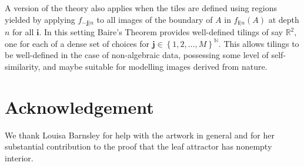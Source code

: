 \documentclass{amsproc}%
\theoremstyle{plain}
\theoremstyle{definition}
\numberwithin{equation}{section}
\begin{document}
A version of the theory also applies when the tiles are defined using regions
yielded by applying $f_{-\mathbf{j}|n}$ to all images of the boundary of $A$
in $f_{\mathbf{i}|n}(A)$ at depth $n$ for all $\mathbf{i}.$ In this setting
Baire's Theorem provides well-defined tilings of say $\mathbb{R}^{2},$ one for
each of a dense set of choices for $\mathbf{j\in}\left\{  1,2,\dots,M\right\}
^{\mathbb{N}}.$ This allows tilings to be well-defined in the case of
non-algebraic data, possessing some level of self-similarity, and maybe
suitable for modelling images derived from nature.

\section{Acknowledgement}

We thank Louisa Barnsley for help with the artwork in general and for her
substantial contribution to the proof that the leaf attractor has nonempty interior.
\end{document}
